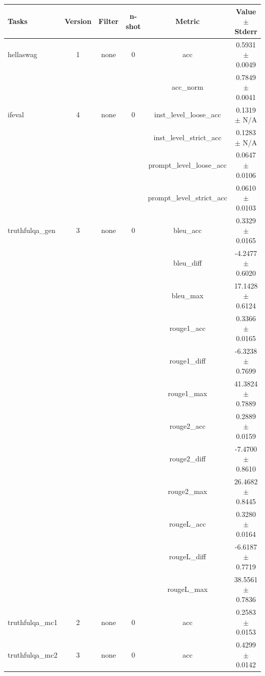 \documentclass{ifacconf}
\begin{document}
\begin{strip}
\begin{minipage}{\textwidth}
    \begin{table}[H]
    \centering
    \begin{tabular}{|l|c|c|c|c|c|}
    \hline
    \textbf{Tasks} & \textbf{Version} & \textbf{Filter} & \textbf{n-shot} & \textbf{Metric} & \textbf{Value} $\pm$ \textbf{Stderr} \\ \hline
    hellaswag & 1 & none & 0 & acc & 0.5931 $\pm$ 0.0049 \\ \hline
    & & & & acc\_norm & 0.7849 $\pm$ 0.0041 \\ \hline
    ifeval & 4 & none & 0 & inst\_level\_loose\_acc & 0.1319 $\pm$ N/A \\ \hline
    & & & & inst\_level\_strict\_acc & 0.1283 $\pm$ N/A \\ \hline
    & & & & prompt\_level\_loose\_acc & 0.0647 $\pm$ 0.0106 \\ \hline
    & & & & prompt\_level\_strict\_acc & 0.0610 $\pm$ 0.0103 \\ \hline
    truthfulqa\_gen & 3 & none & 0 & bleu\_acc & 0.3329 $\pm$ 0.0165 \\ \hline
    & & & & bleu\_diff & -4.2477 $\pm$ 0.6020 \\ \hline
    & & & & bleu\_max & 17.1428 $\pm$ 0.6124 \\ \hline
    & & & & rouge1\_acc & 0.3366 $\pm$ 0.0165 \\ \hline
    & & & & rouge1\_diff & -6.3238 $\pm$ 0.7699 \\ \hline
    & & & & rouge1\_max & 41.3824 $\pm$ 0.7889 \\ \hline
    & & & & rouge2\_acc & 0.2889 $\pm$ 0.0159 \\ \hline
    & & & & rouge2\_diff & -7.4700 $\pm$ 0.8610 \\ \hline
    & & & & rouge2\_max & 26.4682 $\pm$ 0.8445 \\ \hline
    & & & & rougeL\_acc & 0.3280 $\pm$ 0.0164 \\ \hline
    & & & & rougeL\_diff & -6.6187 $\pm$ 0.7719 \\ \hline
    & & & & rougeL\_max & 38.5561 $\pm$ 0.7836 \\ \hline
    truthfulqa\_mc1 & 2 & none & 0 & acc & 0.2583 $\pm$ 0.0153 \\ \hline
    truthfulqa\_mc2 & 3 & none & 0 & acc & 0.4299 $\pm$ 0.0142 \\ \hline
    \end{tabular}
    \label{tab:llama31_awq}
    \end{table}


\end{minipage}
\end{strip}
\end{document}
